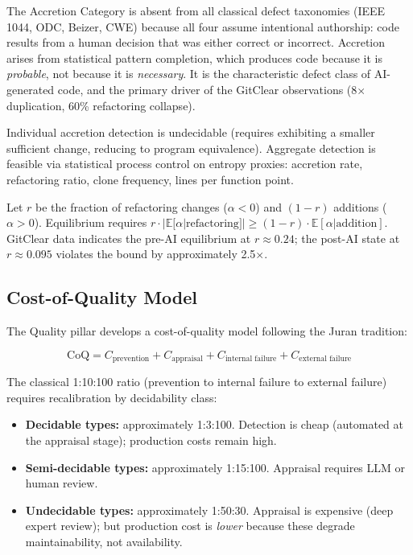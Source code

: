 The Accretion Category is absent from all classical defect taxonomies (IEEE 1044, ODC, Beizer, CWE) because all four assume intentional authorship: code results from a human decision that was either correct or incorrect. Accretion arises from statistical pattern completion, which produces code because it is \emph{probable}, not because it is \emph{necessary}. It is the characteristic defect class of AI-generated code, and the primary driver of the GitClear observations (8$\times$ duplication, 60\% refactoring collapse).

Individual accretion detection is undecidable (requires exhibiting a smaller sufficient change, reducing to program equivalence). Aggregate detection is feasible via statistical process control on entropy proxies: accretion rate, refactoring ratio, clone frequency, lines per function point.

\begin{corollary}
\label{cor:refactoring}
Let $r$ be the fraction of refactoring changes ($\alpha < 0$) and $(1-r)$ additions ($\alpha > 0$). Equilibrium requires $r \cdot |\mathbb{E}[\alpha | \text{refactoring}]| \geq (1-r) \cdot \mathbb{E}[\alpha | \text{addition}]$. GitClear data indicates the pre-AI equilibrium at $r \approx 0.24$; the post-AI state at $r \approx 0.095$ violates the bound by approximately 2.5$\times$.
\end{corollary}

\subsection{Cost-of-Quality Model}

The Quality pillar develops a cost-of-quality model following the Juran tradition:

\begin{equation}
    \text{CoQ} = C_{\text{prevention}} + C_{\text{appraisal}} + C_{\text{internal failure}} + C_{\text{external failure}}
\end{equation}

The classical 1:10:100 ratio (prevention to internal failure to external failure) requires recalibration by decidability class:

\begin{itemize}
\item \textbf{Decidable types:} approximately 1:3:100. Detection is cheap (automated at the appraisal stage); production costs remain high.
\item \textbf{Semi-decidable types:} approximately 1:15:100. Appraisal requires LLM or human review.
\item \textbf{Undecidable types:} approximately 1:50:30. Appraisal is expensive (deep expert review); but production cost is \emph{lower} because these degrade maintainability, not availability.
\end{itemize}

